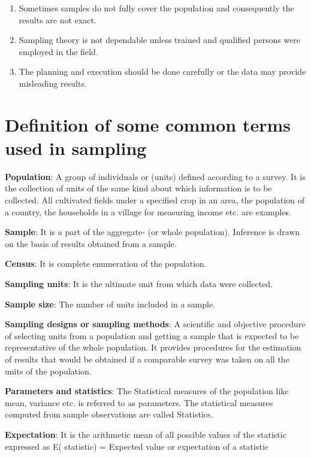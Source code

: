 \documentclass[
]{book}
\providecommand{\tightlist}{%
  \setlength{\itemsep}{0pt}\setlength{\parskip}{0pt}}
\begin{document}
\begin{enumerate}
\def\labelenumi{\arabic{enumi}.}
\tightlist
\item
  Sometimes samples do not fully cover the population and consequently the results are not exact.
\item
  Sampling theory is not dependable unless trained and qualified persons were employed in the field.
\item
  The planning and execution should be done carefully or the data may provide misleading results.
\end{enumerate}

\hypertarget{definition-of-some-common-terms-used-in-sampling}{%
\section{Definition of some common terms used in sampling}\label{definition-of-some-common-terms-used-in-sampling}}

\textbf{Population}: A group of individuals or (units) defined according to a survey. It is the collection of units of the same kind about which information is to be collected. All cultivated fields under a specified crop in an area, the population of a country, the households in a village for measuring income etc. are examples.

\textbf{Sample}: It is a part of the aggregate- (or whole population). Inference is drawn on the basis of results obtained from a sample.

\textbf{Census}: It is complete enumeration of the population.

\textbf{Sampling units}: It is the ultimate unit from which data were collected.

\textbf{Sample size}: The number of units included in a sample.

\textbf{Sampling designs or sampling methods}: A scientific and objective procedure of selecting units from a population and getting a sample that is expected to be representative of the whole population. It provides procedures for the estimation of results that would be obtained if a comparable survey was taken on all the units of the population.

\textbf{Parameters and statistics}: The Statistical measures of the population like mean, variance etc. is referred to as parameters. The statistical measures computed from sample observations are called Statistics.

\textbf{Expectation}: It is the arithmetic mean of all possible values of the statistic expressed as E( statistic) = Expected value or expectation of a statistic
\end{document}
